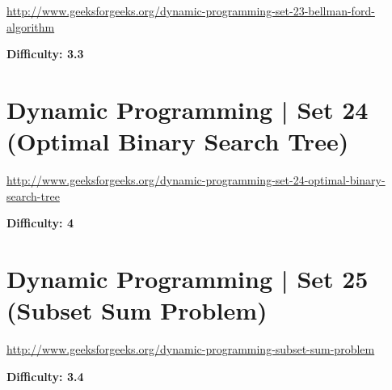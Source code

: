 \url{http://www.geeksforgeeks.org/dynamic-programming-set-23-bellman-ford-algorithm}

\textbf{Difficulty: 3.3}

\textbf{}

\RayNotesBegin



\RayNotesEnd

\textbf{}




\section{Dynamic Programming | Set 24 (Optimal Binary Search Tree)
  \label{secGFGDPSet24OptimalBST}}

\url{http://www.geeksforgeeks.org/dynamic-programming-set-24-optimal-binary-search-tree}

\textbf{Difficulty: 4}

\textbf{}

\RayNotesBegin



\RayNotesEnd

\textbf{}



\section{Dynamic Programming | Set 25 (Subset Sum Problem)
  \label{secGFGDPSet25SubsetSumProb}}

\url{http://www.geeksforgeeks.org/dynamic-programming-subset-sum-problem}

\textbf{Difficulty: 3.4}



\textbf{}

